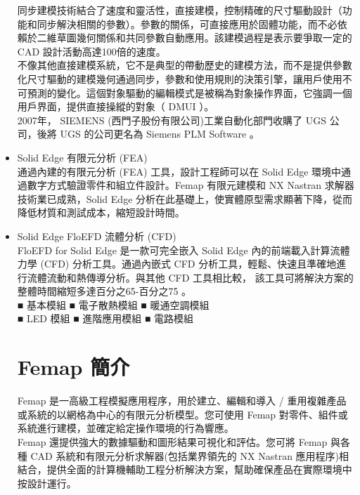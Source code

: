\begin{itemize}
\qquad 同步建模技術結合了速度和靈活性，直接建模，控制精確的尺寸驅動設計（功能和同步解決相關的參數）。參數的關係，可直接應用於固體功能，而不必依賴於二維草圖幾何關係和共同參數自動應用。該建模過程是表示要爭取一定的 CAD 設計活動高達100倍的速度。\\

\qquad 不像其他直接建模系統，它不是典型的帶動歷史的建模方法，而不是提供參數化尺寸驅動的建模幾何通過同步，參數和使用規則的決策引擎，讓用戶使用不可預測的變化。這個對象驅動的編輯模式是被稱為對象操作界面，它強調一個用戶界面，提供直接操縱的對象（ DMUI ）。\\

\qquad 2007年， SIEMENS (西門子股份有限公司)工業自動化部門收購了 UGS 公司，後將 UGS 的公司更名為 Siemens PLM Software 。 \\

\item Solid Edge 有限元分析 (FEA)\\

\qquad 通過內建的有限元分析 (FEA) 工具，設計工程師可以在 Solid Edge 環境中通過數字方式驗證零件和組立件設計。Femap 有限元建模和 NX Nastran 求解器技術業已成熟，Solid Edge 分析在此基礎上，使實體原型需求顯著下降，從而降低材質和測試成本，縮短設計時間。\\

\item Solid Edge FloEFD 流體分析 (CFD)\\

\qquad FloEFD for Solid Edge 是一款可完全嵌入 Solid Edge 內的前端載入計算流體力學 (CFD) 分析工具。通過內嵌式 CFD 分析工具，輕鬆、快速且準確地進行流體流動和熱傳導分析。與其他 CFD 工具相比較， 該工具可將解決方案的整體時間縮短多達百分之65-百分之75 。\\

■ 基本模組 ■ 電子散熱模組 ■ 暖通空調模組\\
■ LED 模組 ■ 進階應用模組 ■ 電路模組\\

\section{Femap 簡介}

\qquad Femap 是一高級工程模擬應用程序，用於建立、編輯和導入 / 重用複雜產品或系統的以網格為中心的有限元分析模型。您可使用 Femap 對零件、組件或系統進行建模，並確定給定操作環境的行為響應。\\

\qquad Femap 還提供強大的數據驅動和圖形結果可視化和評估。您可將 Femap 與各種 CAD 系統和有限元分析求解器(包括業界領先的 NX Nastran 應用程序)相結合，提供全面的計算機輔助工程分析解決方案，幫助確保產品在實際環境中按設計運行。 \\

\end{itemize}

\renewcommand{\baselinestretch}{0.5} %